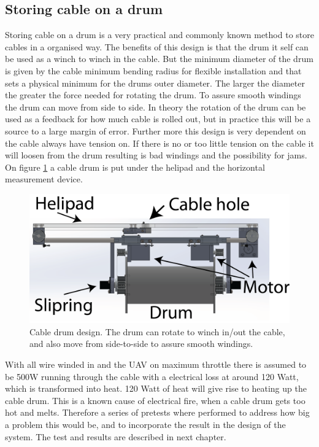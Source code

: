 \subsection{Storing cable on a drum}
Storing cable on a drum is a very practical and commonly known method to store cables in a organised way. The benefits of this design is that the drum it self can be used as a winch to winch in the cable. But the minimum diameter of the drum is given by the cable minimum bending radius for flexible installation and that sets a physical minimum for the drums outer diameter. The larger the diameter the greater the force needed for rotating the drum. To assure smooth windings the drum can move from side to side. 
In theory the rotation of the drum can be used as a feedback for how much cable is rolled out, but in practice this will be a source to a large margin of error. Further more this design is very dependent on the cable always have tension on. If there is no or too little tension on the cable it will loosen from the drum resulting is bad windings and the possibility for jams. \\
On figure \ref{fig:cable-drum} a cable drum is put under the helipad and the horizontal measurement device. 

\begin{figure}[H]
\centering
\includegraphics[scale=0.75]{graphics/cad/cable-drum.png}
\caption[Cable drum design]{Cable drum design. The drum can rotate to winch in/out the cable, and also move from side-to-side to assure smooth windings.}
\label{fig:cable-drum}
\end{figure}

\noindent
With all wire winded in and the UAV on maximum throttle there is assumed to be 500W running through the cable with a electrical loss at around 120 Watt, which is transformed into heat. 120 Watt of heat will give rise to heating up the cable drum. This is a known cause of electrical fire, when a cable drum gets too hot and melts. Therefore a series of pretests where performed to address how big a problem this would be, and to incorporate the result in the design of the system. The test and results are described in next chapter.



